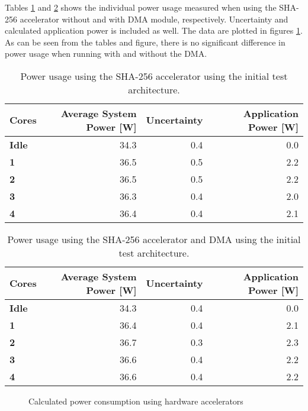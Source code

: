 \begin{appendix}
Tables \ref{tab:SHA-power1} and \ref{tab:SHADMA-power1} shows the individual power usage measured when using the SHA-256 accelerator without and with DMA module, respectively. 
Uncertainty and calculated application power is included as well. The data are plotted in figures \ref{fig:SHA-power1}.
As can be seen from the tables and figure, there is no significant difference in power usage when running with and without the DMA.

\begin{table}
\centering
\begin{tabular}{| l | r | r || r |}
  \hline 
  \textbf{Cores} & \textbf{Average System Power [W]} & \textbf{Uncertainty} & \textbf{Application Power [W]} \\
  \hline                       
  \textbf{Idle} &  34.3 & 0.4 & 0.0 \\
  \textbf{1} &  36.5 & 0.5 & 2.2\\
  \textbf{2} &  36.5 & 0.5 & 2.2\\
  \textbf{3} &  36.3 & 0.4 & 2.0\\
  \textbf{4} &  36.4 & 0.4 & 2.1\\
  \hline 
\end{tabular}
\caption{Power usage using the SHA-256 accelerator using the initial test architecture.}
\label{tab:SHA-power1}
\end{table}

\begin{table}
\centering
\begin{tabular}{| l | r | r || r |}
  \hline 
  \textbf{Cores} & \textbf{Average System Power [W]} & \textbf{Uncertainty} & \textbf{Application Power [W]} \\
  \hline                          
  \textbf{Idle} &  34.3 & 0.4 & 0.0 \\
  \textbf{1} &  36.4 & 0.4 & 2.1\\
  \textbf{2} &  36.7 & 0.3 & 2.3\\
  \textbf{3} &  36.6 & 0.4 & 2.2\\
  \textbf{4} &  36.6 & 0.4 & 2.2\\
  \hline 
\end{tabular}
\caption{Power usage using the SHA-256 accelerator and DMA using the initial test architecture.}
\label{tab:SHADMA-power1}
\end{table}

\begin{figure}
\centering
	\caption{Calculated power consumption using hardware accelerators}
	\label{fig:SHA-power1}
\end{figure}


\end{appendix}
